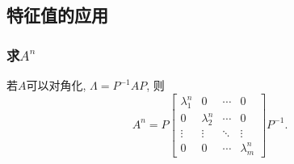 
\subsection{特征值的应用}
\subsubsection{求$A^{n}$}
若$A$可以对角化, $\Lambda = P^{-1} A P$, 则
\begin{equation}
  A^{n} = P \begin{bmatrix}
    \lambda_1^{n}&0&\cdots&0\\
    0&\lambda_2^{n}&\cdots&0\\
    \vdots&\vdots&\ddots&\vdots\\
    0&0&\cdots&\lambda_{m}^{n}
  \end{bmatrix}
  P ^{-1}.
\end{equation}

